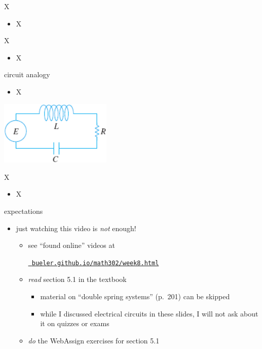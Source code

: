 \documentclass{beamer}
\begin{document}
\begin{frame}{X}

\begin{itemize}
\item X
\end{itemize}
\end{frame}


\begin{frame}{X}

\begin{itemize}
\item X
\end{itemize}
\end{frame}


\begin{frame}{circuit analogy}

\begin{itemize}
\item X
\end{itemize}

\includegraphics[width=0.4\textwidth]{figs/rlc-circuit}
\end{frame}


\begin{frame}{X}

\begin{itemize}
\item X
\end{itemize}
\end{frame}


\begin{frame}{expectations}

\begin{itemize}
\item just watching this video is \emph{not} enough!
     \begin{itemize}
     \item see ``found online'' videos at

     \centerline{\href{https://bueler.github.io/math302/week8.html}{\tt \color{cyan} bueler.github.io/math302/week8.html}}
     \item \emph{read} section 5.1 in the textbook
         \begin{itemize}
         \item material on ``double spring systems'' (p.~201) can be skipped
         \item while I discussed electrical circuits in these slides, I will not ask about it on quizzes or exams
         \end{itemize}
     \item \emph{do} the WebAssign exercises for section 5.1
     \end{itemize}
\end{itemize}
\end{frame}
\end{document}
